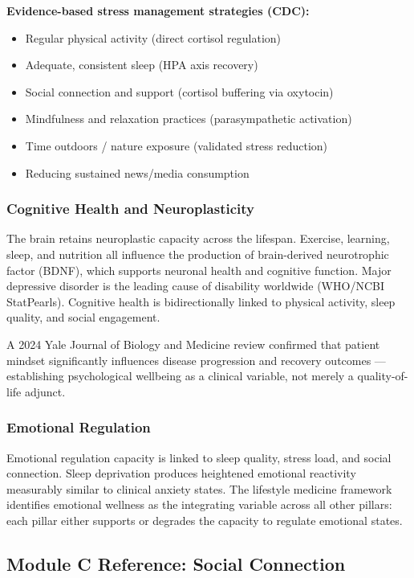 \documentclass[11pt,letterpaper]{article}
\begin{document}
\textbf{Evidence-based stress management strategies (CDC):}
\begin{itemize}[leftmargin=1.5em]
  \item Regular physical activity (direct cortisol regulation)
  \item Adequate, consistent sleep (HPA axis recovery)
  \item Social connection and support (cortisol buffering via oxytocin)
  \item Mindfulness and relaxation practices (parasympathetic activation)
  \item Time outdoors / nature exposure (validated stress reduction)
  \item Reducing sustained news/media consumption
\end{itemize}

\subsubsection{Cognitive Health and Neuroplasticity}

The brain retains neuroplastic capacity across the lifespan. Exercise, learning, sleep, and nutrition all influence the production of brain-derived neurotrophic factor (BDNF), which supports neuronal health and cognitive function. Major depressive disorder is the leading cause of disability worldwide (WHO/NCBI StatPearls). Cognitive health is bidirectionally linked to physical activity, sleep quality, and social engagement.

A 2024 Yale Journal of Biology and Medicine review confirmed that patient mindset significantly influences disease progression and recovery outcomes --- establishing psychological wellbeing as a clinical variable, not merely a quality-of-life adjunct.

\subsubsection{Emotional Regulation}

Emotional regulation capacity is linked to sleep quality, stress load, and social connection. Sleep deprivation produces heightened emotional reactivity measurably similar to clinical anxiety states. The lifestyle medicine framework identifies emotional wellness as the integrating variable across all other pillars: each pillar either supports or degrades the capacity to regulate emotional states.

\subsection{Module C Reference: Social Connection}
\end{document}
